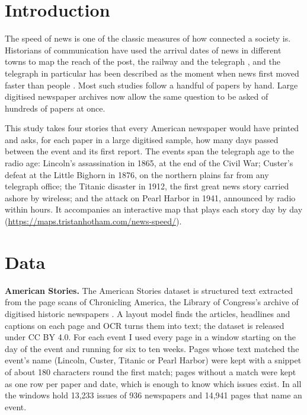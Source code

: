 \documentclass[11pt,a4paper]{article}
\begin{document}
\section{Introduction}
The speed of news is one of the classic measures of how connected a society is. Historians of communication have used the arrival dates of news in different towns to map the reach of the post, the railway and the telegraph \citep{pred1973}, and the telegraph in particular has been described as the moment when news first moved faster than people \citep{standage1998,blondheim1994}. Most such studies follow a handful of papers by hand. Large digitised newspaper archives now allow the same question to be asked of hundreds of papers at once.

This study takes four stories that every American newspaper would have printed and asks, for each paper in a large digitised sample, how many days passed between the event and its first report. The events span the telegraph age to the radio age: Lincoln's assassination in 1865, at the end of the Civil War; Custer's defeat at the Little Bighorn in 1876, on the northern plains far from any telegraph office; the Titanic disaster in 1912, the first great news story carried ashore by wireless; and the attack on Pearl Harbor in 1941, announced by radio within hours. It accompanies an interactive map that plays each story day by day (\url{https://maps.tristanhotham.com/news-speed/}).

\section{Data}
\textbf{American Stories.} The American Stories dataset \citep{dell2023} is structured text extracted from the page scans of Chronicling America, the Library of Congress's archive of digitised historic newspapers \citep{chronam}. A layout model finds the articles, headlines and captions on each page and OCR turns them into text; the dataset is released under CC BY 4.0. For each event I used every page in a window starting on the day of the event and running for six to ten weeks. Pages whose text matched the event's name (Lincoln, Custer, Titanic or Pearl Harbor) were kept with a snippet of about 180 characters round the first match; pages without a match were kept as one row per paper and date, which is enough to know which issues exist. In all the windows hold 13,233 issues of 936 newspapers and 14,941 pages that name an event.
\end{document}
